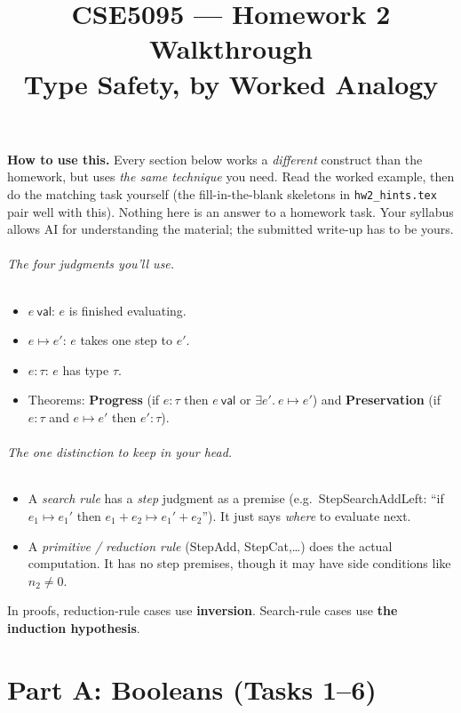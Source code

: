 \documentclass[11pt]{article}
\title{CSE5095 --- Homework 2 Walkthrough\\
\large Type Safety, by Worked Analogy}
\author{}
\date{}
\newcommand{\val}[1]{#1\ \mathsf{val}}
\newcommand{\stepto}[2]{#1 \mapsto #2}
\begin{document}
\maketitle

\textbf{How to use this.} Every section below works a \emph{different}
construct than the homework, but uses \emph{the same technique} you need.
Read the worked example, then do the matching task yourself (the
fill-in-the-blank skeletons in \texttt{hw2\_hints.tex} pair well with this).
Nothing here is an answer to a homework task. Your syllabus allows AI for
understanding the material; the submitted write-up has to be yours.

\paragraph{The four judgments you'll use.}
\begin{itemize}
  \item $\val{e}$: $e$ is finished evaluating.
  \item $\stepto{e}{e'}$: $e$ takes one step to $e'$.
  \item $e:\tau$: $e$ has type $\tau$.
  \item Theorems: \textbf{Progress} (if $e:\tau$ then $\val{e}$ or
        $\exists e'.\ \stepto{e}{e'}$) and \textbf{Preservation} (if $e:\tau$
        and $\stepto{e}{e'}$ then $e':\tau$).
\end{itemize}

\paragraph{The one distinction to keep in your head.}
\begin{itemize}
  \item A \emph{search rule} has a \emph{step} judgment as a premise
        (e.g.\ StepSearchAddLeft: ``if $e_1\mapsto e_1'$ then
        $e_1+e_2\mapsto e_1'+e_2$''). It just says \emph{where} to evaluate
        next.
  \item A \emph{primitive / reduction rule} (StepAdd, StepCat,\dots) does
        the actual computation. It has no step premises, though it may have
        side conditions like $n_2\neq 0$.
\end{itemize}
In proofs, reduction-rule cases use \textbf{inversion}. Search-rule cases use
\textbf{the induction hypothesis}.

\part*{Part A: Booleans (Tasks 1--6)}
\end{document}
